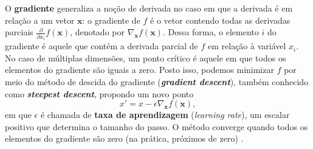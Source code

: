 \documentclass{automatextcc}
\newcommand{\R}{\mathds{R}}
\newcommand{\bs}[1]{\boldsymbol{#1}}
\begin{document}
O \textbf{gradiente} generaliza a noção de derivada no caso em que a derivada é em relação a um vetor $\bs{x}$: o gradiente de $f$ é o vetor contendo todas as derivadas parciais $\frac{\partial}{\partial x_i} f(\bs{x})$, denotado por $\nabla_{\bs{x}} f(\bs{x})$. Dessa forma, o elemento $i$ do gradiente é aquele que contém a derivada parcial de $f$ em relação à variável $x_i$. No caso de múltiplas dimensões, um ponto crítico é aquele em que todos os elementos do gradiente são iguais a zero. Posto isso, podemos minimizar $f$ por meio do método de descida do gradiente (\textit{\textbf{gradient descent}}), também conhecido como \textit{\textbf{steepest descent}}, propondo um novo ponto
\begin{equation*}
    x' = x - \epsilon \nabla_{\bs{x}} f(\bs{x}),
\end{equation*}
em que $\epsilon$ é chamada de \textbf{taxa de aprendizagem} (\textit{learning rate}), um escalar positivo que determina o tamanho do passo. O método converge quando todos os elementos do gradiente são zero (na prática, próximos de zero) \citep{goodfellow2016}. 







\end{document}
